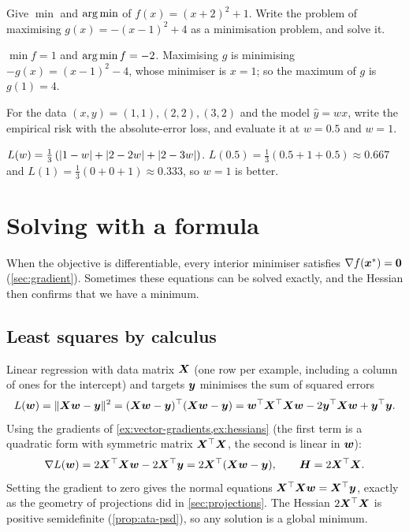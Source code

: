 \begin{exercise}
Give $\min$ and $\operatorname*{arg\,min}$ of $f(x) = (x + 2)^2 + 1$. Write the problem of
maximising $g(x) = -(x - 1)^2 + 4$ as a minimisation problem, and solve it.
\end{exercise}
\begin{solution}
$\min f = 1$ and $\operatorname*{arg\,min} f = -2$. Maximising $g$ is minimising
$-g(x) = (x - 1)^2 - 4$, whose minimiser is $x = 1$; so the maximum of $g$ is
$g(1) = 4$.
\end{solution}

\begin{exercise}
For the data $(x, y) = (1, 1), (2, 2), (3, 2)$ and the model $\hat y = wx$, write
the empirical risk with the absolute-error loss, and evaluate it at $w = 0.5$
and $w = 1$.
\end{exercise}
\begin{solution}
$L(w) = \tfrac13\left(\lvert1 - w\rvert + \lvert2 - 2w\rvert + \lvert2 - 3w\rvert\right)$.
$L(0.5) = \tfrac13(0.5 + 1 + 0.5) \approx 0.667$ and
$L(1) = \tfrac13(0 + 0 + 1) \approx 0.333$, so $w = 1$ is better.
\end{solution}

\section{Solving with a formula}\label{sec:analytic-optimisation}

When the objective is differentiable, every interior minimiser satisfies
$\nabla f(\bm{x}^*) = \bm{0}$ (\cref{sec:gradient}). Sometimes these equations can
be solved exactly, and the Hessian then confirms that we have a minimum.

\subsection{Least squares by calculus}

Linear regression with data matrix $\bm{X}$ (one row per example, including a
column of ones for the intercept) and targets $\bm{y}$ minimises the sum of
squared errors
\[
  L(\bm{w}) = \lVert\bm{X}\bm{w} - \bm{y}\rVert^2 = (\bm{X}\bm{w} - \bm{y})^\top(\bm{X}\bm{w} - \bm{y})
  = \bm{w}^\top\bm{X}^\top\bm{X}\bm{w} - 2\bm{y}^\top\bm{X}\bm{w} + \bm{y}^\top\bm{y} .
\]
Using the gradients of \cref{ex:vector-gradients,ex:hessians} (the first term is a
quadratic form with symmetric matrix $\bm{X}^\top\bm{X}$, the second is linear in
$\bm{w}$):
\[
  \nabla L(\bm{w}) = 2\bm{X}^\top\bm{X}\bm{w} - 2\bm{X}^\top\bm{y} = 2\bm{X}^\top(\bm{X}\bm{w} - \bm{y}),
  \qquad \bm{H} = 2\bm{X}^\top\bm{X} .
\]
Setting the gradient to zero gives the normal equations
$\bm{X}^\top\bm{X}\bm{w} = \bm{X}^\top\bm{y}$, exactly as the geometry of projections did in
\cref{sec:projections}. The Hessian $2\bm{X}^\top\bm{X}$ is positive semidefinite
(\cref{prop:ata-psd}), so any solution is a global minimum.

